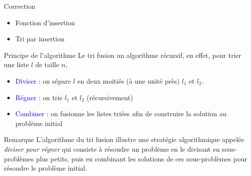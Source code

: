 \documentclass[10pt]{beamer}
\begin{document}
\begin{frame}[fragile]{\Ctitle}{\stitle}
	\begin{exampleblock}{Correction}
		\begin{itemize}
			\item Fonction d'insertion
			\item Tri par insertion
		\end{itemize}
	\end{exampleblock}
\end{frame}

\begin{frame}{\Ctitle}{\stitle}
	\begin{alertblock}{Principe de l'algorithme}
		Le tri fusion un algorithme récursif, en effet, pour trier une liste $l$ de taille $n$,
		\begin{itemize}
			\item<2-> \textcolor{blue}{Diviser} : on sépare $l$ en deux moitiés (à une unité près) $l_1$ et $l_2$. 
			\item<3-> \textcolor{blue}{Régner } : on trie $l_1$ et $l_2$ (récursivement)
			\item<4-> \textcolor{blue}{Combiner } : on fusionne les listes triées afin de construire la solution au problème initial
		\end{itemize}
	\end{alertblock}
	\begin{block}{Remarque}
		L'algorithme du tri fusion illustre une stratégie algorithmique appelée \textit{diviser pour régner} qui consiste à résoudre un problème en le divisant en sous-problèmes plus petits, puis en combinant les solutions de ces sous-problèmes pour résoudre le problème initial.
	\end{block}
\end{frame}
\end{document}
